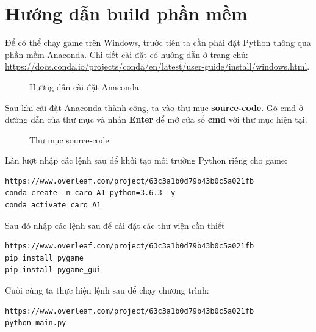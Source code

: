 \section{Hướng dẫn build phần mềm}
Để có thể chạy game trên Windows, trước tiên ta cần phải đặt Python thông qua phần mềm Anaconda. Chi tiết cài đặt có hướng dẫn ở trang chủ: \url{https://docs.conda.io/projects/conda/en/latest/user-guide/install/windows.html}.
\begin{figure}[H]
\caption{Hướng dẫn cài đặt Anaconda}
\end{figure}
Sau khi cài đặt Anaconda thành công, ta vào thư mục \textbf{source-code}. Gõ cmd ở đường dẫn của thư mục và nhấn \textbf{Enter} để mở cửa sổ \textbf{cmd} với thư mục hiện tại.
\begin{figure}[H]
\caption{Thư mục source-code}
\end{figure}
Lần lượt nhập các lệnh sau để khởi tạo môi trường Python riêng cho game:
\begin{lstlisting}https://www.overleaf.com/project/63c3a1b0d79b43b0c5a021fb
conda create -n caro_A1 python=3.6.3 -y
conda activate caro_A1
\end{lstlisting}

Sau đó nhập các lệnh sau để cài đặt các thư viện cần thiết
\begin{lstlisting}https://www.overleaf.com/project/63c3a1b0d79b43b0c5a021fb
pip install pygame
pip install pygame_gui
\end{lstlisting}

Cuối cùng ta thực hiện lệnh sau để chạy chương trình:
\begin{lstlisting}https://www.overleaf.com/project/63c3a1b0d79b43b0c5a021fb
python main.py
\end{lstlisting}